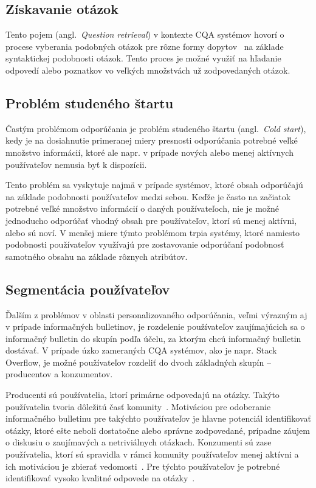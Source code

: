 \subsection{Získavanie otázok}

Tento pojem (angl.~\emph{Question retrieval}) v kontexte CQA systémov hovorí o procese vyberania podobných otázok pre
rôzne formy dopytov~\cite{Zhang2014} na základe syntaktickej podobnosti otázok.
Tento proces je možné využiť na hľadanie odpovedí alebo poznatkov vo veľkých množstvách už zodpovedaných otázok.


\subsection{Problém studeného štartu}

Častým problémom odporúčania je problém studeného štartu (angl.~\emph{Cold start}), kedy je na dosiahnutie primeranej
miery presnosti odporúčania potrebné veľké množstvo informácií, ktoré ale napr. v prípade nových alebo menej aktívnych
používateľov nemusia byť k dispozícii.

Tento problém sa vyskytuje najmä v prípade systémov, ktoré obsah odporúčajú na základe
podobnosti používateľov medzi sebou. Keďže je často na začiatok potrebné veľké množstvo informácií o daných používateľoch,
nie je možné jednoducho odporúčať vhodný obsah pre používateľov, ktorí sú menej aktívni, alebo sú noví.
V menšej miere týmto problémom trpia systémy, ktoré namiesto podobnosti používateľov využívajú pre zostavovanie odporúčaní
podobnosť samotného obsahu na základe rôznych atribútov.

\subsection{Segmentácia používateľov}

Ďalším z problémov v oblasti personalizovaného odporúčania, veľmi výrazným aj v prípade informačných bulletinov,
je rozdelenie používateľov zaujímajúcich sa o informačný bulletin do skupín podľa účelu, za ktorým chcú informačný bulletin dostávať.
V prípade úzko zameraných CQA systémov, ako je napr. Stack Overflow, je možné používateľov rozdeliť do dvoch základných
skupín -- producentov a konzumentov.

Producenti sú používatelia, ktorí primárne odpovedajú na otázky. Takýto používatelia
tvoria dôležitú časť komunity~\cite{Anderson2012}. Motiváciou pre odoberanie informačného bulletinu pre takýchto používateľov
je hlavne potenciál identifikovať otázky, ktoré ešte neboli dostatočne alebo správne zodpovedané, prípadne záujem
o diskusiu o zaujímavých a netriviálnych otázkach. Konzumenti sú zase používatelia, ktorí sú spravidla v rámci komunity
používateľov menej aktívni a ich motiváciou je zbierať vedomosti~\cite{Anderson2012}. Pre týchto používateľov je potrebné
identifikovať vysoko kvalitné odpovede na otázky~\cite{Toba2014}.

